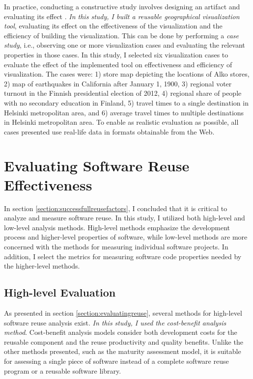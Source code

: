 In practice, conducting a constructive study involves designing an artifact and evaluating its effect \citep{jarvinen_tutkimustyon_2012}. \emph{In this study, I built a reusable geographical visualization tool}, evaluating its effect on the effectiveness of the visualization and the efficiency of building the visualization. This can be done by performing a \emph{case study}, i.e., observing one or more visualization cases and evaluating the relevant properties in those cases. In this study, I selected six visualization cases to evaluate the effect of the implemented tool on effectiveness and efficiency of visualization. The cases were: 1) store map depicting the locations of Alko stores, 2) map of earthquakes in California after January 1, 1900, 3) regional voter turnout in the Finnish presidential election of 2012, 4) regional share of people with no secondary education in Finland, 5) travel times to a single destination in Helsinki metropolitan area, and 6) average travel times to multiple destinations in Helsinki metropolitan area. To enable as realistic evaluation as possible, all cases presented use real-life data in formats obtainable from the Web.

\section{Evaluating Software Reuse Effectiveness}

In section \ref{section:successfullreusefactors}, I concluded that it is critical to analyze and measure software reuse. In this study, I utilized both high-level and low-level analysis methods. High-level methods emphasize the development process and higher-level properties of software, while low-level methods are more concerned with the methods for measuring individual software projects. In addition, I select the metrics for measuring software code properties needed by the higher-level methods.

\subsection{High-level Evaluation}
As presented in section \ref{section:evaluatingreuse}, several methods for high-level software reuse analysis exist. \emph{In this study, I used the cost-benefit analysis method}. Cost-benefit analysis models consider both development costs for the reusable component and the reuse productivity and quality benefits. Unlike the other methods presented, such as the maturity assessment model, it is suitable for assessing a single piece of software instead of a complete software reuse program or a reusable software library.

